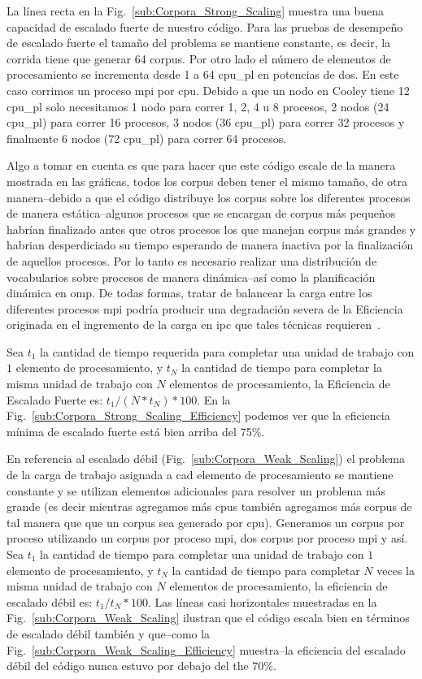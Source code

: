 {La línea recta en la Fig.~\ref{sub:Corpora_Strong_Scaling} muestra una buena capacidad de escalado fuerte de nuestro código.
Para las pruebas de desempeño de escalado fuerte el tamaño del problema se mantiene constante, es decir, la corrida tiene que generar 64 corpus.
Por otro lado el número de elementos de procesamiento se incrementa desde 1 a 64 \gls{cpu_pl} en potencias de dos.
En este caso corrimos un proceso \gls{mpi} por \gls{cpu}.
Debido a que un nodo en Cooley tiene 12 \gls{cpu_pl} solo necesitamos 1 nodo para correr 1, 2, 4 u 8 procesos, 2 nodos (24 \gls{cpu_pl}) para correr 16 procesos, 3 nodos (36 \gls{cpu_pl}) para correr 32 procesos y finalmente 6 nodos (72 \gls{cpu_pl}) para correr 64 procesos.

Algo a tomar en cuenta es que para hacer que este código escale de la manera mostrada en las gráficas, todos los corpus deben tener el mismo tamaño, de otra manera--debido a que el código distribuye los corpus sobre los diferentes procesos de manera estática--algunos procesos que se encargan de corpus más pequeños habrían finalizado antes que otros procesos los que manejan corpus más grandes y habrian desperdiciado su tiempo esperando de manera inactiva por la finalización de aquellos procesos.
Por lo tanto es necesario realizar una distribución de vocabularios sobre procesos de manera dinámica--así como la planificación dinámica en \gls{omp}.
De todas formas, tratar de balancear la carga entre los diferentes procesos \gls{mpi} podría producir una degradación severa de la Eficiencia originada en el ingremento de la carga en \gls{ipc} que tales técnicas requieren~\cite{hu2012biophysically}.

Sea $t_1$ la cantidad de tiempo requerida para completar una unidad de trabajo con $1$ elemento de procesamiento, y $t_N$ la cantidad de tiempo para completar la misma unidad de trabajo con $N$ elementos de procesamiento, la Eficiencia de Escalado Fuerte es: $t_1 / (N * t_N) * 100$. En la Fig.~\ref{sub:Corpora_Strong_Scaling_Efficiency} podemos ver que la eficiencia mínima de escalado fuerte está bien arriba del 75\%.

En referencia al escalado débil (Fig.~\ref{sub:Corpora_Weak_Scaling}) el problema de la carga de trabajo asignada a cad elemento de procesamiento se mantiene constante y se utilizan elementos adicionales para resolver un problema más grande (es decir mientras agregamos más \glspl{cpu} también agregamos más corpus de tal manera que que un corpus sea generado por \gls{cpu}).
Generamos un corpus por proceso utilizando un corpus por proceso \gls{mpi}, dos corpus por proceso \gls{mpi} y así.
Sea $t_1$ la cantidad de tiempo para completar una unidad de trabajo con $1$ elemento de procesamiento, y $t_N$ la cantidad de tiempo para completar $N$ veces la misma unidad de trabajo con $N$ elementos de procesamiento, la eficiencia de escalado débil es: $t_1 / t_N * 100$. Las líneas casi horizontales muestradas en la Fig.~\ref{sub:Corpora_Weak_Scaling} ilustran que el código escala bien en términos de escalado débil también y que--como la Fig.~\ref{sub:Corpora_Weak_Scaling_Efficiency} muestra--la eficiencia del escalado débil del código nunca estuvo por debajo del the 70\%.
}{
}
